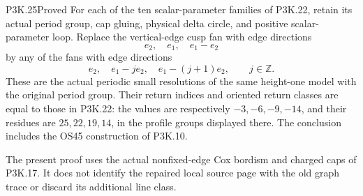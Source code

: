 \begin{statement}{P3K.25}{Proved}
For each of the ten scalar-parameter families of P3K.22, retain its
actual period group, cap gluing, physical delta circle, and positive
scalar-parameter loop. Replace the vertical-edge cusp fan with edge
directions
\[
 e_2,\quad e_1,\quad e_1-e_2
\]
by any of the fans with edge directions
\[
 e_2,\quad e_1-j e_2,\quad e_1-(j+1)e_2,\qquad j\in\mathbb Z.
                                                        \tag{P3K.25.1}
\]
These are the actual periodic small resolutions of the same
height-one model with the original period group. Their return
indices and oriented return classes are equal to those in P3K.22:
the values are respectively \(-3,-6,-9,-14\), and their residues
are \(25,22,19,14\), in the profile groups displayed there.
The conclusion includes the OS45 construction of P3K.10.

The present proof uses the actual nonfixed-edge Cox bordism and
charged caps of P3K.17. It does not identify the repaired local
source page with the old graph trace or discard its additional
line class.
\end{statement}
